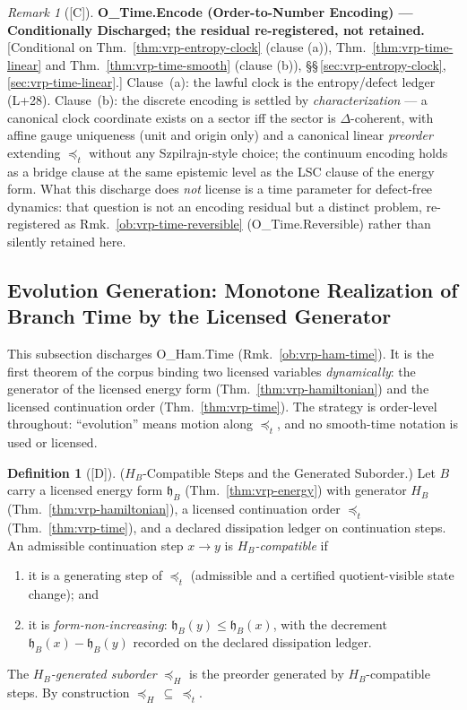 \documentclass[12pt,oneside]{amsbook}
\theoremstyle{plain}
\theoremstyle{definition}
\newtheorem{definition}[theorem]{Definition}
\theoremstyle{remark}
\newtheorem{remark}[theorem]{Remark}
\newcommand{\status}[1]{\textup{[#1]}}
\begin{document}
\begin{remark}[\status{C}]\label{ob:vrp-time-encode}
\textbf{O\_Time.Encode (Order-to-Number Encoding) ---
Conditionally Discharged; the residual re-registered, not
retained.}
\textup{[Conditional on Thm.~\ref{thm:vrp-entropy-clock} (clause
(a)), Thm.~\ref{thm:vrp-time-linear} and
Thm.~\ref{thm:vrp-time-smooth} (clause (b)),
\S\S\,\ref{sec:vrp-entropy-clock}, \ref{sec:vrp-time-linear}.]}
Clause~(a): the lawful clock is the entropy/defect ledger
(L+28).  Clause~(b): the discrete encoding is settled by
\emph{characterization} --- a canonical clock coordinate exists on
a sector iff the sector is $\Delta$-coherent, with affine gauge
uniqueness (unit and origin only) and a canonical linear
\emph{preorder} extending $\preceq_t$ without any Szpilrajn-style
choice; the continuum encoding holds as a bridge clause at the
same epistemic level as the LSC clause of the energy form.
What this discharge does \emph{not} license is a time parameter
for defect-free dynamics: that question is not an encoding
residual but a distinct problem, re-registered as
Rmk.~\ref{ob:vrp-time-reversible} (O\_Time.Reversible) rather
than silently retained here.
\end{remark}

\subsection{Evolution Generation: Monotone Realization of Branch
Time by the Licensed Generator}
\label{sec:vrp-ham-time}

This subsection discharges O\_Ham.Time
(Rmk.~\ref{ob:vrp-ham-time}).  It is the first theorem of the
corpus binding two licensed variables \emph{dynamically}: the
generator of the licensed energy form
(Thm.~\ref{thm:vrp-hamiltonian}) and the licensed continuation
order (Thm.~\ref{thm:vrp-time}).  The strategy is order-level
throughout: ``evolution'' means motion along $\preceq_t$, and no
smooth-time notation is used or licensed.

\begin{definition}[\status{D}]\label{def:hb-compatible-step}
\textup{($H_B$-Compatible Steps and the Generated Suborder.)}
Let $B$ carry a licensed energy form $\mathfrak{h}_B$
(Thm.~\ref{thm:vrp-energy}) with generator $H_B$
(Thm.~\ref{thm:vrp-hamiltonian}), a licensed continuation order
$\preceq_t$ (Thm.~\ref{thm:vrp-time}), and a declared dissipation
ledger on continuation steps.  An admissible continuation step
$x \to y$ is \emph{$H_B$-compatible} if
\begin{enumerate}[label=\textup{(\roman*)}]
  \item it is a generating step of $\preceq_t$ (admissible and a
    certified quotient-visible state change); and
  \item it is \emph{form-non-increasing}:
    $\mathfrak{h}_B(y) \le \mathfrak{h}_B(x)$, with the decrement
    $\mathfrak{h}_B(x) - \mathfrak{h}_B(y)$ recorded on the
    declared dissipation ledger.
\end{enumerate}
The \emph{$H_B$-generated suborder} $\preceq_H$ is the preorder
generated by $H_B$-compatible steps.  By construction
$\preceq_H \,\subseteq\, \preceq_t$.
\end{definition}
\end{document}
